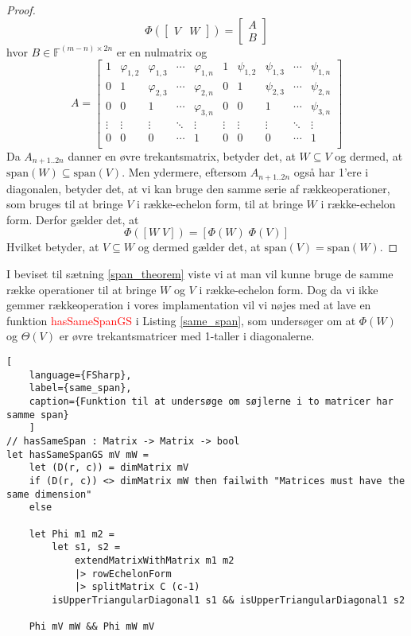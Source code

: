 \begin{proof}
    \[
    \Phi\left( \begin{bmatrix} V & W \end{bmatrix} \right) = 
        \begin{bmatrix}
            A \\ 
            B
        \end{bmatrix}
    \]
    hvor \(B \in \mathbb{F}^{(m-n) \times 2n}\) er en nulmatrix og 
    \[ A = 
    \begin{bmatrix}
        1 & \varphi_{1,2} & \varphi_{1,3} & \cdots & \varphi_{1,n} & 1 & \psi_{1,2} & \psi_{1,3} & \cdots & \psi_{1,n} \\
        0 & 1 & \varphi_{2,3} & \cdots & \varphi_{2,n} & 0 & 1 & \psi_{2,3} & \cdots & \psi_{2,n} \\
        0 & 0 & 1 & \cdots & \varphi_{3,n} & 0 & 0 & 1 & \cdots & \psi_{3,n} \\
        \vdots & \vdots & \vdots & \ddots & \vdots & \vdots & \vdots & \vdots & \ddots & \vdots \\
        0 & 0 & 0 & \cdots & 1 & 0 & 0 & 0 & \cdots & 1 \\ 
    \end{bmatrix}
    \]
    Da \(A_{n+1..2n}\) danner en øvre trekantsmatrix, betyder det, at \( W \subseteq V\) og dermed, at \(\text{span}(W) \subseteq \text{span}(V)\). Men ydermere, eftersom \(A_{n+1..2n}\) også har 1'ere i diagonalen, betyder det, at vi kan bruge den samme serie af rækkeoperationer, som bruges til at bringe \(V\) i række-echelon form, til at bringe \(W\) i række-echelon form. Derfor gælder det, at
    \[
    \Phi([W \; V]) = [\Phi(W) \; \Phi(V)]   
    \]
    Hvilket betyder, at \(V \subseteq W\) og dermed gælder det, at \(\text{span}(V) = \text{span}(W)\).   
\end{proof}


I beviset til sætning \ref{span_theorem} viste vi at man vil kunne bruge de samme række operationer til at bringe \(W\) og \(V\) i række-echelon form. Dog da vi ikke gemmer rækkeoperation i vores implamentation vil vi nøjes med at lave en funktion \textcolor{red}{hasSameSpanGS} i Listing \ref{same_span}, som undersøger om at \(\Phi(W)\) og \(\Theta(V)\) er øvre trekantsmatricer med 1-taller i diagonalerne. 

\begin{lstlisting}[
    language={FSharp}, 
    label={same_span},
    caption={Funktion til at undersøge om søjlerne i to matricer har samme span}
    ]
// hasSameSpan : Matrix -> Matrix -> bool
let hasSameSpanGS mV mW = 
    let (D(r, c)) = dimMatrix mV
    if (D(r, c)) <> dimMatrix mW then failwith "Matrices must have the same dimension"
    else
    
    let Phi m1 m2 = 
        let s1, s2 = 
            extendMatrixWithMatrix m1 m2 
            |> rowEchelonForm 
            |> splitMatrix C (c-1)
        isUpperTriangularDiagonal1 s1 && isUpperTriangularDiagonal1 s2

    Phi mV mW && Phi mW mV
\end{lstlisting}

